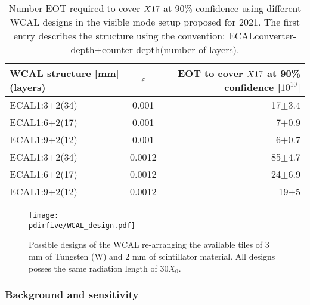 \begin{center}
\begin{table}[tbh!]
\begin{tabular}{lcr}
  WCAL structure [mm](layers)  & $\epsilon$  & EOT to cover $X17$ at 90\% confidence [$10^{10}$] \\
  \hline
  ECAL1:3+2(34)                & 0.001   & 17$\pm$3.4                                            \\ 
  ECAL1:6+2(17)                & 0.001   & 7$\pm$0.9                                             \\
  ECAL1:9+2(12)                & 0.001   & 6$\pm$0.7                                             \\
  ECAL1:3+2(34)                & 0.0012  & 85$\pm$4.7                                            \\
  ECAL1:6+2(17)                & 0.0012  & 24$\pm$6.9                                            \\  
  ECAL1:9+2(12)                & 0.0012  & 19$\pm$5                                              \\  
  \hline
\end{tabular}
\caption[Possible WCAL design and with their possible experimental reach]{Number EOT required to cover $X17$ at 90\% confidence using different WCAL designs in the visible mode setup proposed for 2021. The first entry describes the structure using the convention:
  ECALconverter-depth+counter-depth(number-of-layers).}
\label{tab:wcal-length-results}
\end{table}
\end{center}

\begin{figure}[tbh!]
  \centering
  \texttt{[image: \\pdirfive/WCAL\_design.pdf]}
  \caption[New WCAL design for 2021]{Possible designs of the WCAL re-arranging the available tiles of 3 mm of Tungsten (W) and 2 mm of scintillator material. All designs posses the same radiation length of 30$X_0$.}
  \label{fig:wcal-design}
\end{figure}


\subsubsection{Background and sensitivity}
\label{ch5:sec:background-sensitivity}

